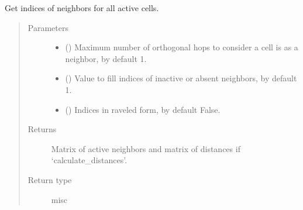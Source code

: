 \documentclass[letterpaper,10pt,english]{sphinxmanual}
\begin{document}
\begin{fulllineitems}
\begin{fulllineitems}
\label{\detokenize{api/grids:geology.src.Grid.get_neighbors_matrix}}
Get indices of neighbors for all active cells.
\begin{quote}\begin{description}
\item[{Parameters}] \leavevmode\begin{itemize}
\item {} 
 (\sphinxstyleliteralemphasis{\sphinxupquote{, }}) \textendash{} Maximum number of orthogonal hops to consider a cell is
as a neighbor, by default 1.

\item {} 
 (\sphinxstyleliteralemphasis{\sphinxupquote{, }}) \textendash{} Value to fill indices of inactive or absent neighbors, by default \sphinxhyphen{}1.

\item {} 
 (\sphinxstyleliteralemphasis{\sphinxupquote{, }}) \textendash{} Indices in raveled form, by default False.

\end{itemize}

\item[{Returns}] \leavevmode
{} \textendash{} Matrix of active neighbors and matrix of distances if ‘calculate\_distances’.

\item[{Return type}] \leavevmode
misc

\end{description}\end{quote}

\end{fulllineitems}


\end{fulllineitems}
\end{document}
